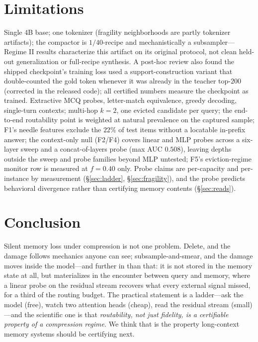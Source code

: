 \documentclass[11pt]{article}
\begin{document}
\section{Limitations}
Single 4B base; one tokenizer (fragility neighborhoods are partly tokenizer
artifacts); the compactor is $1/40$-recipe and mechanistically a
subsampler---Regime II results characterize this artifact on its original
protocol, not clean held-out generalization or full-recipe synthesis. A
post-hoc review also found the shipped checkpoint's training
loss used a support-construction variant that double-counted the gold token
whenever it was already in the teacher top-$200$ (corrected in the released
code); all certified numbers measure the checkpoint as trained. Extractive
MCQ probes, letter-match equivalence, greedy decoding, single-turn contexts;
multi-hop $k{=}2$, one evicted candidate per query; the end-to-end
routability point is weighted at natural prevalence on the captured sample;
F1's needle features exclude the $22\%$ of test items without a locatable
in-prefix answer; the context-only null (F2/F4) covers linear and MLP probes
across a six-layer sweep and a concat-of-layers probe (max AUC $0.508$),
leaving depths outside the sweep and probe families beyond MLP untested;
F5's eviction-regime monitor row is measured at $f{=}0.40$ only.
Probe claims are per-capacity and per-instance by measurement
(\S\ref{sec:ladder}, \S\ref{sec:fragility}), and the probe predicts
behavioral divergence rather than certifying memory contents
(\S\ref{sec:reads}).

\section{Conclusion}
Silent memory loss under compression is not one problem. Delete, and the
damage follows mechanics anyone can see; subsample-and-smear, and the damage
moves inside the model---and further in than that: it is not stored in the
memory state at all, but materializes in the encounter between query and
memory, where a linear probe on the residual stream recovers what every
external signal missed, for a third of the routing budget. The practical
statement is a ladder---ask the model (free), watch two attention heads
(cheap), read the residual stream (small)---and the scientific one is that
\emph{routability, not just fidelity, is a certifiable property of a
compression regime.} We think that is the property long-context memory
systems should be certifying next.



\end{document}
